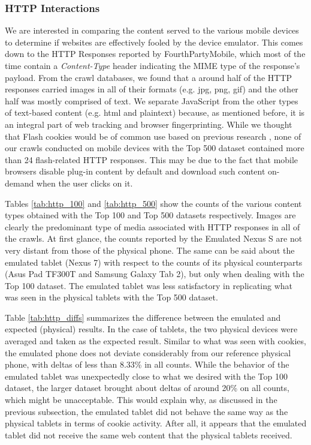 \documentclass{acm_proc_article-sp}
\begin{document}
\subsubsection{HTTP Interactions}

We are interested in comparing the content served to the various mobile devices to determine if websites are effectively fooled by the device emulator. This comes down to the HTTP Responses reported by FourthPartyMobile, which most of the time contain a \emph{Content-Type} header indicating the MIME type of the response's payload. From the crawl databases, we found that a around half of the HTTP responses carried images in all of their formats (e.g. jpg, png, gif) and the other half was mostly comprised of text. We separate JavaScript from the other types of text-based content (e.g. html and plaintext) because, as mentioned before, it is an integral part of web tracking and browser fingerprinting. While we thought that Flash cookies would be of common use based on previous research \cite{FLASH_COOKIES}, none of our crawls conducted on mobile devices with the Top 500 dataset contained more than 24 flash-related HTTP responses. This may be due to the fact that mobile browsers disable plug-in content by default and download such content on-demand when the user clicks on it.

Tables \ref{tab:http_100} and \ref{tab:http_500} show the counts of the various content types obtained with the Top 100 and Top 500 datasets respectively. Images are clearly the predominant type of media associated with HTTP responses in all of the crawls. At first glance, the counts reported by the Emulated Nexus S are not very distant from those of the physical phone. The same can be said about the emulated tablet (Nexus 7) with respect to the counts of its physical counterparts (Asus Pad TF300T and Samsung Galaxy Tab 2), but only when dealing with the Top 100 dataset. The emulated tablet was less satisfactory in replicating what was seen in the physical tablets with the Top 500 dataset.

Table \ref{tab:http_diffs} summarizes the difference between the emulated and expected (physical) results. In the case of tablets, the two physical devices were averaged and taken as the expected result. Similar to what was seen with cookies, the emulated phone does not deviate considerably from our reference physical phone, with deltas of less than 8.33\% in all counts. While the behavior of the emulated tablet was unexpectedly close to what we desired with the Top 100 dataset, the larger dataset brought about deltas of around 20\% on all counts, which might be unacceptable. This would explain why, as discussed in the previous subsection, the emulated tablet did not behave the same way as the physical tablets in terms of cookie activity. After all, it appears that the emulated tablet did not receive the same web content that the physical tablets received.
\end{document}
